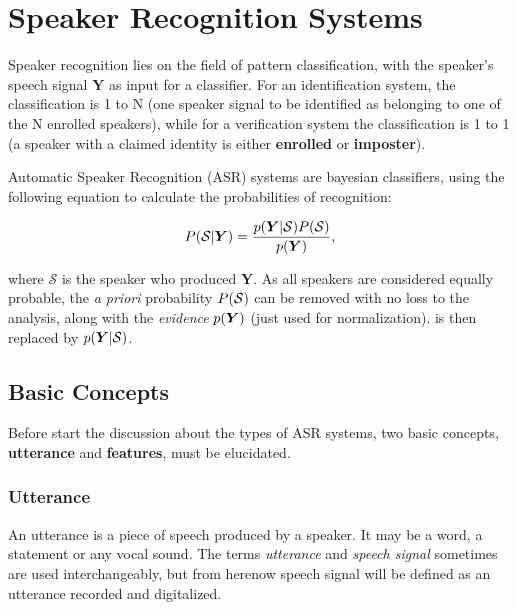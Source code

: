 \chapter{Speaker Recognition Systems}
\label{ch:speaker-recognition-systems}

Speaker recognition lies on the field of pattern classification, with the speaker's speech signal $\boldsymbol{Y}$ as input for a classifier. For an identification system, the classification is 1 to N (one speaker signal to be identified as belonging to one of the N enrolled speakers), while for a verification system the classification is 1 to 1 (a speaker with a claimed identity is either \textbf{enrolled} or \textbf{imposter}).

Automatic Speaker Recognition (ASR) systems are bayesian classifiers, using the following equation to calculate the probabilities of recognition:

\begin{equation}
    \postprob{\mathcal{S}}{\boldsymbol{Y}} = \frac{\postpdf{\boldsymbol{Y}}{\mathcal{S}} \prob{\mathcal{S}}}{\pdf{\boldsymbol{Y}}},
    \label{eq:bayes_equation}
\end{equation}

\noindent where $\mathcal{S}$ is the speaker who produced $\boldsymbol{Y}$. As all speakers are considered equally probable, the \emph{a priori} probability $P(\mathcal{S})$ can be removed with no loss to the analysis, along with the \emph{evidence} $p(\boldsymbol{Y})$ (just used for normalization).  is then replaced by $p(\boldsymbol{Y}|\mathcal{S})$.

\section{Basic Concepts}
\label{sec:basic-concepts}

Before start the discussion about the types of ASR systems, two basic concepts, \textbf{utterance} and \textbf{features}, must be elucidated.

\subsection{Utterance}

An utterance is a piece of speech produced by a speaker. It may be a word, a statement or any vocal sound. The terms \emph{utterance} and \emph{speech signal} sometimes are used interchangeably, but from herenow speech signal will be defined as an utterance recorded and digitalized.

